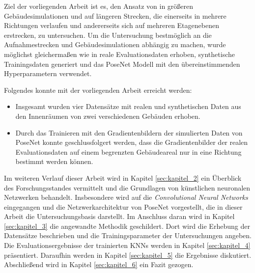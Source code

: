 Ziel der vorliegenden Arbeit ist es, den Ansatz von \citet{acharyaBIMPoseNetIndoorCamera2019} in größeren Gebäudesimulationen und auf längeren Strecken, die einerseits in mehrere Richtungen verlaufen und andererseits sich auf mehreren Etagenebenen erstrecken, zu untersuchen. Um die Untersuchung bestmöglich an die Aufnahmestrecken und Gebäudesimulationen abhängig zu machen, wurde möglichst gleichermaßen wie in \cite{acharyaBIMPoseNetIndoorCamera2019} reale Evaluationsdaten erhoben, synthetische Trainingsdaten generiert und das PoseNet Modell mit den übereinstimmenden Hyperparametern verwendet.

Folgendes konnte mit der vorliegenden Arbeit erreicht werden:
\begin{itemize}
	\item
	Insgesamt wurden vier Datensätze mit realen und synthetischen Daten aus den Innenräumen von zwei verschiedenen Gebäuden erhoben.
	\item 
	 Durch das Trainieren mit den Gradientenbildern der simulierten Daten von PoseNet konnte geschlussfolgert werden, dass die Gradientenbilder der realen Evaluationsdaten auf einem begrenzten Gebäudeareal nur in eine Richtung bestimmt werden können.
\end{itemize}





Im weiteren Verlauf dieser Arbeit wird in Kapitel \ref{sec:kapitel_2} ein Überblick des Forschungsstandes vermittelt und die Grundlagen von künstlichen neuronalen Netzwerken behandelt. Insbesondere wird auf die \textit{Convolutional Neural Networks} eingegangen und die Netzwerkarchitektur von PoseNet vorgestellt, die in dieser Arbeit die Untersuchungsbasis darstellt. Im Anschluss daran wird in Kapitel \ref{sec:kapitel_3} die angewandte Methodik geschildert. Dort wird die Erhebung der Datensätze beschrieben und die Trainingsparameter der Untersuchungen angeben. Die Evaluationsergebnisse der trainierten KNNs werden in Kapitel \ref{sec:kapitel_4} präsentiert. Daraufhin werden in Kapitel \ref{sec:kapitel_5} die Ergebnisse diskutiert. Abschließend wird in Kapitel \ref{sec:kapitel_6} ein Fazit gezogen. 


